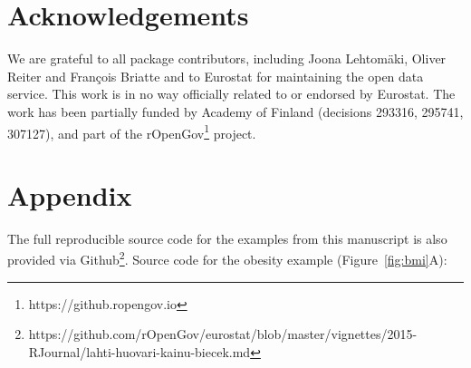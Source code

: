 \section*{Acknowledgements}

We are grateful to all package contributors, including Joona
Lehtom{\"a}ki, Oliver Reiter and Fran\c{c}ois Briatte and to Eurostat
for maintaining the open data service. This work is in no way
officially related to or endorsed by Eurostat. The work has been
partially funded by Academy of Finland (decisions 293316, 295741,
307127), and part of the rOpenGov\footnote{https://github.ropengov.io}
project.




\address{Leo Lahti\\
  Department of Mathematics and Statistics\\
  PO Box 20014 University of Turku\\
  Finland\\}

\address{Janne Huovari\\
  Pellervo Economic Research PTT\\
  Eerikinkatu 28 A 00180 Helsinki\\
  Finland\\}

\address{Markus Kainu\\
  Research Department, The Social Insurance Institution of Finland\\
  PO Box 450, 00101 Helsinki\\
  Finland\\}

\address{Przemys{\l}aw Biecek\\
  Faculty of Mathematics, Informatics, and Mechanics\\
  University of Warsaw\\
  Banacha 2, 02-097 Warsaw\\
  Poland\\}

\newpage

\section{Appendix}

The full reproducible source code for the examples from this manuscript is also provided via Github\footnote{https://github.com/rOpenGov/eurostat/blob/master/vignettes/2015-RJournal/lahti-huovari-kainu-biecek.md}. Source code for the obesity example (Figure~\ref{fig:bmi}A):


